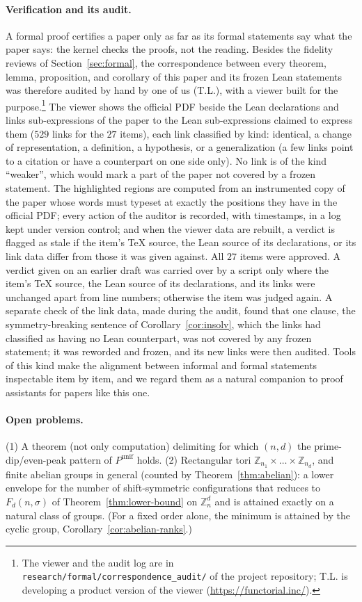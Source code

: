 \documentclass[11pt,a4paper]{article}
\theoremstyle{remark}
\newcommand{\ZZ}{\mathbb{Z}}
\begin{document}
\paragraph{Verification and its audit.}
A formal proof certifies a paper only as far as its formal statements say
what the paper says: the kernel checks the proofs, not the reading. Besides
the fidelity reviews of Section~\ref{sec:formal}, the correspondence between
every theorem, lemma, proposition, and corollary of this paper and its
frozen Lean statements was therefore audited by hand by one of us (T.L.),
with a viewer built for the purpose.\footnote{The viewer and the audit log are in \texttt{research/formal/correspondence\_audit/} of the project repository;
T.L. is developing a product version of the viewer (\url{https://functorial.inc/}).} The viewer shows the official PDF beside the
Lean declarations and links sub-expressions of the paper to the Lean
sub-expressions claimed to express them ($529$ links for the $27$ items),
each link classified by kind: identical, a change of representation, a
definition, a hypothesis, or a generalization (a few links point to a
citation or have a counterpart on one side only). No link is of the kind
``weaker'', which would mark a part of the paper not covered by a frozen
statement. The highlighted regions are computed from an instrumented copy
of the paper whose words must typeset at exactly the positions they have in
the official PDF; every action of the auditor is recorded, with timestamps,
in a log kept under version control; and when the viewer data are rebuilt,
a verdict is flagged as stale if the item's \TeX{} source, the Lean source of
its declarations, or its link data differ from those it was given against.
All $27$ items were approved. A verdict given on an earlier draft was carried
over by a script only where the item's \TeX{} source, the Lean source of its
declarations, and its links were unchanged apart from line numbers; otherwise
the item was judged again.
A separate check of the link data, made during the audit, found
that one clause, the symmetry-breaking sentence of
Corollary~\ref{cor:insolv}, which the links had classified as having no Lean
counterpart, was not covered by any frozen statement; it was reworded and
frozen, and its new links were then audited. Tools of this kind make the
alignment between informal and formal statements inspectable item by item,
and we regard them as a natural companion to proof assistants for papers
like this one.

\paragraph{Open problems.}
(1) A theorem (not only computation) delimiting for which $(n,d)$ the
prime-dip/even-peak pattern of $P^{\mathrm{unif}}$ holds. (2) Rectangular
tori $\ZZ_{n_1}\times\dots\times\ZZ_{n_d}$, and finite abelian groups in
general (counted by Theorem~\ref{thm:abelian}): a lower envelope for the
number of shift-symmetric configurations that reduces to $F_d(n,\sigma)$ of
Theorem~\ref{thm:lower-bound} on $\ZZ_n^d$ and is attained exactly on a
natural class of groups. (For a fixed order alone, the minimum is attained by the cyclic
group, Corollary~\ref{cor:abelian-ranks}.)
\end{document}
